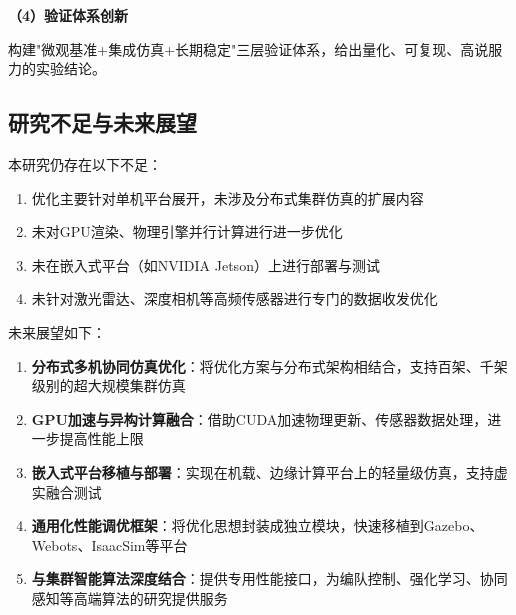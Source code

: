 \textbf{（4）验证体系创新}

构建"微观基准+集成仿真+长期稳定"三层验证体系，给出量化、可复现、高说服力的实验结论。

\subsection{研究不足与未来展望}

本研究仍存在以下不足：

\begin{enumerate}
    \item 优化主要针对单机平台展开，未涉及分布式集群仿真的扩展内容
    \item 未对GPU渲染、物理引擎并行计算进行进一步优化
    \item 未在嵌入式平台（如NVIDIA Jetson）上进行部署与测试
    \item 未针对激光雷达、深度相机等高频传感器进行专门的数据收发优化
\end{enumerate}

未来展望如下：

\begin{enumerate}
    \item \textbf{分布式多机协同仿真优化}：将优化方案与分布式架构相结合，支持百架、千架级别的超大规模集群仿真
    
    \item \textbf{GPU加速与异构计算融合}：借助CUDA加速物理更新、传感器数据处理，进一步提高性能上限
    
    \item \textbf{嵌入式平台移植与部署}：实现在机载、边缘计算平台上的轻量级仿真，支持虚实融合测试
    
    \item \textbf{通用化性能调优框架}：将优化思想封装成独立模块，快速移植到Gazebo、Webots、IsaacSim等平台
    
    \item \textbf{与集群智能算法深度结合}：提供专用性能接口，为编队控制、强化学习、协同感知等高端算法的研究提供服务
\end{enumerate}
